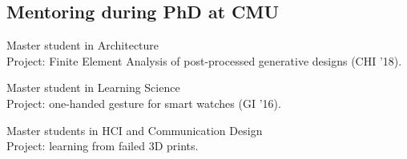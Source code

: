 %
%
%
%
%
%

\subsection{Mentoring during PhD at CMU}
 {
	 {
		Master student in Architecture\\
		Project: Finite Element Analysis of post-processed generative designs (CHI '18).
	}
}

 {
	 {
		Master student in Learning Science\\
		Project: one-handed gesture for smart watches (GI '16).
	}
}

 {
	 {
		Master students in HCI and Communication Design\\
		Project: learning from failed 3D prints.
	}
}